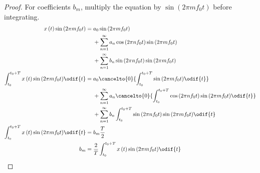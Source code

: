 \documentclass{article}
\begin{document}
\begin{proof}
    For coefficients \(b_m\), multiply the equation by \(\sin{\left( 2
    \pi m f_0 t \right)}\) before integrating.
    \begin{align*}
        x\left( t \right) \sin{\left( 2 \pi m f_0 t \right)}                               & =
                                                                                               \begin{aligned}[t]
                                                                                                    & a_0 \sin{\left( 2 \pi m f_0 t \right)}                                                          \\
                                                                                                    & + \sum_{n = 1}^\infty a_n \cos{\left( 2 \pi n f_0 t \right)} \sin{\left( 2 \pi m f_0 t \right)} \\
                                                                                                    & + \sum_{n = 1}^\infty b_n \sin{\left( 2 \pi n f_0 t \right)} \sin{\left( 2 \pi m f_0 t \right)}
                                                                                               \end{aligned}
        \\
        \int_{t_0}^{t_0 + T} x\left( t \right) \sin{\left( 2 \pi m f_0 t \right)} \odif{t} & =
                                                                                               \begin{aligned}[t]
                                                                                                    & a_0 \cancelto{0}{\int_{t_0}^{t_0 + T} \sin{\left( 2 \pi m f_0 t \right)} \odif{t}}                                                          \\
                                                                                                    & + \sum_{n = 1}^\infty a_n \cancelto{0}{\int_{t_0}^{t_0 + T} \cos{\left( 2 \pi n f_0 t \right)} \sin{\left( 2 \pi m f_0 t \right)} \odif{t}} \\
                                                                                                    & + \sum_{n = 1}^\infty b_n \int_{t_0}^{t_0 + T} \sin{\left( 2 \pi n f_0 t \right)} \sin{\left( 2 \pi m f_0 t \right)} \odif{t}
                                                                                               \end{aligned}
        \\
        \int_{t_0}^{t_0 + T} x\left( t \right) \sin{\left( 2 \pi m f_0 t \right)} \odif{t} & = b_m \frac{T}{2}                                                                                                                                       \\
        b_m                                                                                & = \frac{2}{T} \int_{t_0}^{t_0 + T} x\left( t \right) \sin{\left( 2 \pi m f_0 t \right)} \odif{t}
    \end{align*}
\end{proof}
\end{document}
